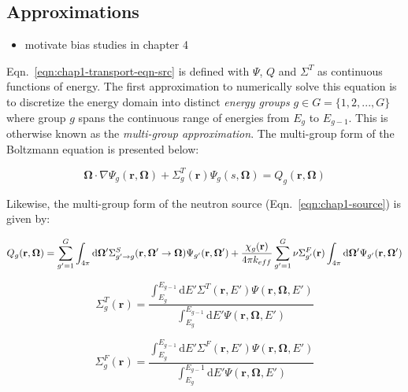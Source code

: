 \subsection{Approximations}
\label{subsec:chap2-approx}

\begin{itemize}
  \item motivate bias studies in chapter 4
\end{itemize}

Eqn.~\ref{eqn:chap1-transport-eqn-src} is defined with $\Psi$, $Q$ and $\Sigma^T$ as continuous functions of energy. The first approximation to numerically solve this equation is to discretize the energy domain into distinct \textit{energy groups} $g \in G = \{1, 2, ..., G\}$ where group $g$ spans the continuous range of energies from $E_{g}$ to $E_{g-1}$. This is otherwise known as the \textit{multi-group approximation}. The multi-group form of the Boltzmann equation is presented below:

\begin{equation}
\label{eqn:chap2-transport-eqn-mg}
\mathbf{\Omega} \cdot \nabla \Psi_g(\mathbf{r},\mathbf{\mathbf{\Omega}}) + \Sigma^T_{g}(\mathbf{r})\Psi_g(s,\mathbf{\Omega}) = Q_g(\mathbf{r},\mathbf{\Omega})
\end{equation}

Likewise, the multi-group form of the neutron source (Eqn.~\ref{eqn:chap1-source}) is given by:

\begin{dmath}
\label{eqn:chap2-source-mg}
Q_g(\mathbf{r},\mathbf{\Omega}) = \displaystyle\sum\limits_{g'=1}^G \int_{4\pi} \mathrm{d}\mathbf{\Omega'}\Sigma_{g'\rightarrow g}^S(\mathbf{r},{\mathbf{\Omega'}\rightarrow\mathbf{\Omega}}) \Psi_{g'}(\mathbf{r},\mathbf{\Omega'}) + \\ \frac{\chi_{g}(\mathbf{r})}{4\pi k_{eff}} \displaystyle\sum\limits_{g'=1}^G \nu\Sigma_{g'}^F(\mathbf{r}) \int_{4\pi} \mathrm{d}\mathbf{\Omega'} \Psi_{g'}(\mathbf{r},\mathbf{\Omega'})
\end{dmath}

\begin{equation}
\label{eqn:moc-theory-condensed-total-xs}
\Sigma_{g}^T(\mathbf{r}) = \frac{\int_{E_{g}}^{E_{g-1}}\mathrm{d}E'\Sigma^T(\mathbf{r},E')\Psi(\mathbf{r},\mathbf{\Omega},E')}{\int_{E_{g}}^{E_{g-1}}\mathrm{d}E'\Psi(\mathbf{r},\mathbf{\Omega},E')}
\end{equation}

\begin{equation}
\label{eqn:moc-theory-condensed-fission-xs}
\Sigma_{g}^F(\mathbf{r}) = \frac{\int_{E_{g}}^{E_{g-1}}\mathrm{d}E'\Sigma^F(\mathbf{r},E')\Psi(\mathbf{r},\mathbf{\Omega},E')}{\int_{E_{g}}^{E_{g-}1}\mathrm{d}E'\Psi(\mathbf{r},\mathbf{\Omega},E')}
\end{equation}

